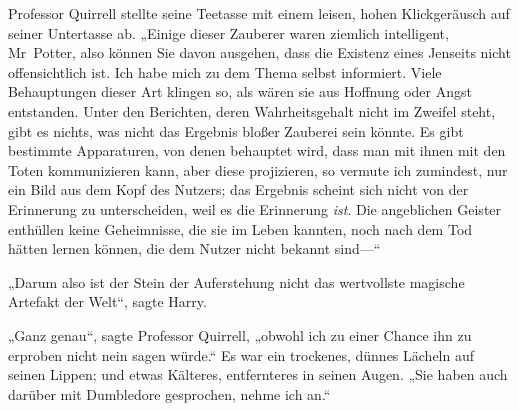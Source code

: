 Professor Quirrell stellte seine Teetasse mit einem leisen, hohen Klickgeräusch auf seiner Untertasse ab.
„Einige dieser Zauberer waren ziemlich intelligent, Mr~Potter, also können Sie davon ausgehen, dass die Existenz eines Jenseits nicht offensichtlich ist. Ich habe mich zu dem Thema selbst informiert. Viele Behauptungen dieser Art klingen so, als wären sie aus Hoffnung oder Angst entstanden. Unter den Berichten, deren Wahrheitsgehalt nicht im Zweifel steht, gibt es nichts, was nicht das Ergebnis bloßer Zauberei sein könnte. Es gibt bestimmte Apparaturen, von denen behauptet wird, dass man mit ihnen mit den Toten kommunizieren kann, aber diese projizieren, so vermute ich zumindest, nur ein Bild aus dem Kopf des Nutzers; das Ergebnis scheint sich nicht von der Erinnerung zu unterscheiden, weil es die Erinnerung \emph{ist}. Die angeblichen Geister enthüllen keine Geheimnisse, die sie im Leben kannten, noch nach dem Tod hätten lernen können, die dem Nutzer nicht bekannt sind—“

„Darum also ist der Stein der Auferstehung nicht das wertvollste magische Artefakt der Welt“, sagte Harry.

„Ganz genau“, sagte Professor Quirrell, „obwohl ich zu einer Chance ihn zu erproben nicht nein sagen würde.“ Es war ein trockenes, dünnes Lächeln auf seinen Lippen; und etwas Kälteres, entfernteres in seinen Augen.
„Sie haben auch darüber mit Dumbledore gesprochen, nehme ich an.“

